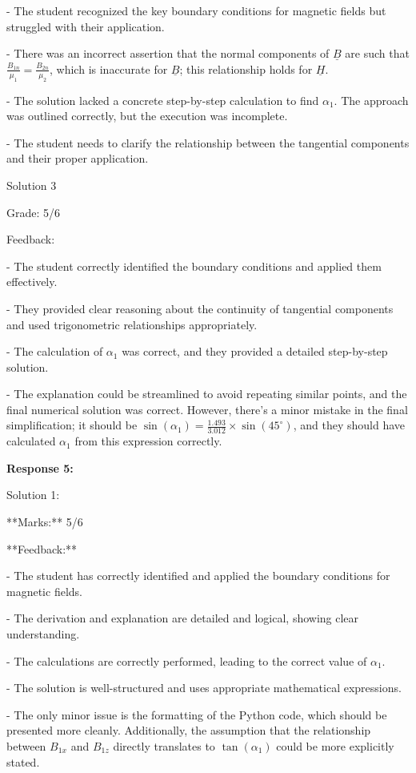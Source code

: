 \documentclass[a4paper,11pt]{article}
\begin{document}
- The student recognized the key boundary conditions for magnetic fields but struggled with their application.

- There was an incorrect assertion that the normal components of \( \underline{B} \) are such that \( \frac{B_{1n}}{\mu_{1}} = \frac{B_{2n}}{\mu_{2}} \), which is inaccurate for \( \underline{B} \); this relationship holds for \( \underline{H} \).

- The solution lacked a concrete step-by-step calculation to find \( \alpha_1 \). The approach was outlined correctly, but the execution was incomplete.

- The student needs to clarify the relationship between the tangential components and their proper application.

Solution 3

Grade: 5/6

Feedback:

- The student correctly identified the boundary conditions and applied them effectively.

- They provided clear reasoning about the continuity of tangential components and used trigonometric relationships appropriately.

- The calculation of \( \alpha_1 \) was correct, and they provided a detailed step-by-step solution.

- The explanation could be streamlined to avoid repeating similar points, and the final numerical solution was correct. However, there's a minor mistake in the final simplification; it should be \( \sin(\alpha_1) = \frac{1.493}{3.012} \times \sin(45^\circ) \), and they should have calculated \(\alpha_1\) from this expression correctly.

\bigskip 
\textbf{Response 5:}

Solution 1:

**Marks:** 5/6

**Feedback:** 

- The student has correctly identified and applied the boundary conditions for magnetic fields.

- The derivation and explanation are detailed and logical, showing clear understanding.

- The calculations are correctly performed, leading to the correct value of \(\alpha_{1}\).

- The solution is well-structured and uses appropriate mathematical expressions.

- The only minor issue is the formatting of the Python code, which should be presented more cleanly. Additionally, the assumption that the relationship between \( B_{1x} \) and \( B_{1z} \) directly translates to \(\tan(\alpha_{1})\) could be more explicitly stated.
\end{document}
